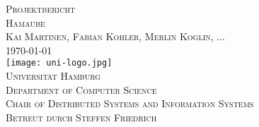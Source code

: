 \begin{titlepage}
\begin{center}
	\vspace{6em}
	{\Large \textsc{Projektbericht}}\\
	\vspace{5em}
	{\huge \textsc{Hamaube}}\\
	\vspace{4em}
	{\Large \textsc{Kai Martinen, Fabian Kohler, Merlin Koglin, ...}}\\
	\vspace{3em}
	{\Large \textsc{\today}}\\
	\vspace{3em}
	\texttt{[image: uni-logo.jpg]}\\
	\vspace{3em}
	{\Large \textsc{Universität Hamburg}}\\
	\vspace{1em}
	{\Large \textsc{Department of Computer Science}}\\
	\vspace{1em}
	{\Large \textsc{Chair of Distributed Systems and Information Systems}}\\
	\vspace{2em}
	{\Large \textsc{Betreut durch Steffen Friedrich}}\\
	
\end{center}
\end{titlepage}